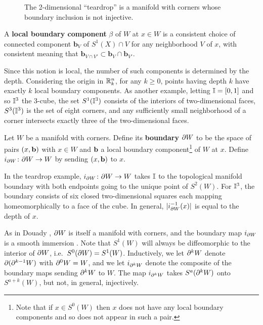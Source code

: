 \begin{figure}[h]
	
	\caption{The 2-dimensional ``teardrop'' is a manifold with corners whose boundary inclusion is not injective.}
	\label{F: teardrop}
\end{figure}

\begin{definition}
	A \textbf{local boundary component} $\beta$ of $W$ at $x \in W$ is a consistent choice of connected component $\mathbf{b}_V$ of $S^1(X) \cap V$ for any neighborhood $V$ of $x$, with consistent meaning that $\mathbf{b}_{V \cap V'} \subset \mathbf{b}_{V} \cap \mathbf{b}_{V'}$.
\end{definition}

Since this notion is local, the number of such components is determined by the depth.
Considering the origin in $\mathbb{R}^n_k$, for any $k \geq 0$, points having depth $k$ have exactly $k$ local boundary components.
As another example, letting $\mathbb{I} = [0,1]$ and so $\mathbb{I}^3$ the 3-cube, the set $S^1(\mathbb{I}^3)$ consists of the interiors of two-dimensional faces, $S^3(\mathbb{I}^3)$ is the set of eight corners, and any sufficiently small neighborhood of a corner intersects exactly three of the two-dimensional faces.

\begin{definition}\label{D: MWC boundary}
	Let $W$ be a manifold with corners.
	Define its \textbf{boundary} $\partial W$ to be the space of pairs $(x, \mathbf{b})$ with $x \in W$ and $\mathbf{b}$ a local boundary component\footnote{Note that if $x \in S^0(W)$ then $x$ does not have any local boundary components and so does not appear in such a pair.} of $W$ at $x$.
	Define $i_{\partial W} \colon \partial W \to W$ by sending $(x,\mathbf{b})$ to $x$.
\end{definition}

In the teardrop example, $i_{\partial W} \colon \partial W \to W$ takes $\mathbb{I}$ to the topological manifold boundary with both endpoints going to the unique point of $S^2(W)$.
For $\mathbb{I}^3$, the boundary consists of six closed two-dimensional squares each mapping homeomorphically to a face of the cube.
In general, $|i_{\partial W}^{-1}(x)|$ is equal to the depth of $x$.

As in Douady \cite{Doua61}, $\partial W$ is itself a manifold with corners, and the boundary map $i_{\partial W}$ is a smooth immersion \cite[Theorem 3.4]{Joy12}. Note that $S^1(W)$ will always be diffeomorphic to the interior of $\partial W$, i.e.\ $S^0(\partial W) = S^1(W)$.
Inductively, we let $\partial^k W$ denote $\partial (\partial^{k-1} W)$ with $\partial^0 W = W$, and we let $i_{\partial^k W}$ denote the composite of the boundary maps sending $\partial^k W$ to $W$. The map $i_{\partial^k W}$ takes $S^a(\partial^k W)$ onto $S^{a+k}(W)$, but not, in general, injectively.

